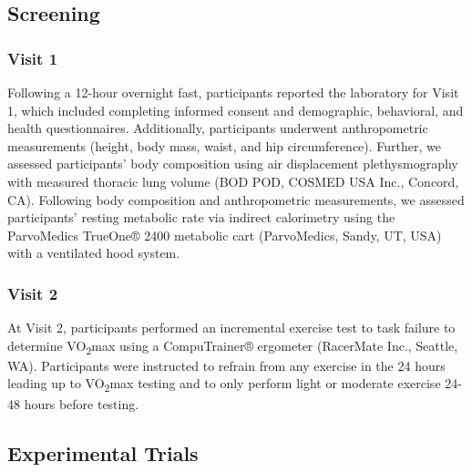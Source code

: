 \documentclass[]{cik}%
\begin{document}
\hypertarget{screening}{%
\subsection{Screening}\label{screening}}

\hypertarget{visit-1}{%
\subsubsection{Visit 1}\label{visit-1}}

Following a 12-hour overnight fast, participants reported the laboratory
for Visit 1, which included completing informed consent and demographic,
behavioral, and health questionnaires. Additionally, participants
underwent anthropometric measurements (height, body mass, waist, and hip
circumference). Further, we assessed participants' body composition
using air displacement plethysmography with measured thoracic lung
volume (BOD POD, COSMED USA Inc., Concord, CA). Following body
composition and anthropometric measurements, we assessed participants'
resting metabolic rate via indirect calorimetry using the ParvoMedics
TrueOne® 2400 metabolic cart (ParvoMedics, Sandy, UT, USA) with a
ventilated hood system.

\hypertarget{visit-2}{%
\subsubsection{Visit 2}\label{visit-2}}

At Visit 2, participants performed an incremental exercise test to task
failure to determine VO\textsubscript{2}max using a CompuTrainer®
ergometer (RacerMate Inc., Seattle, WA). Participants were instructed to
refrain from any exercise in the 24 hours leading up to
VO\textsubscript{2}max testing and to only perform light or moderate
exercise 24-48 hours before testing.

\hypertarget{experimental-trials}{%
\subsection{Experimental Trials}\label{experimental-trials}}
\end{document}
